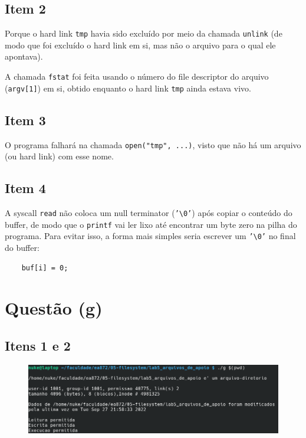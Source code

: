 \documentclass{article}
\begin{document}
\subsection*{Item 2}

Porque o hard link \texttt{tmp} havia sido excluído por meio da chamada \texttt{unlink} (de modo que foi excluído o hard link em si, mas não o arquivo para o qual ele apontava).

A chamada \texttt{fstat} foi feita usando o número do file descriptor do arquivo (\texttt{argv[1]}) em si, obtido enquanto o hard link \texttt{tmp} ainda estava vivo.

\subsection*{Item 3}

O programa falhará na chamada \texttt{open("tmp", ...)}, visto que não há um arquivo (ou hard link) com esse nome.

\subsection*{Item 4}

A syscall \texttt{read} não coloca um null terminator (\texttt{'\textbackslash 0'}) 
após copiar o conteúdo do buffer, de modo que o \texttt{printf} vai ler lixo até encontrar um byte zero na pilha do programa. Para evitar isso, a forma mais simples seria escrever um \texttt{'\textbackslash 0'} 
no final do buffer:

\begin{verbatim}
    buf[i] = 0;
\end{verbatim}

\section*{Questão (g)}
\subsection*{Itens 1 e 2}

\begin{figure}[!ht]
    \begin{center}
        \includegraphics[width=\textwidth]{images/questao_g1.png}
    \end{center}
\end{figure} 
\end{document}
